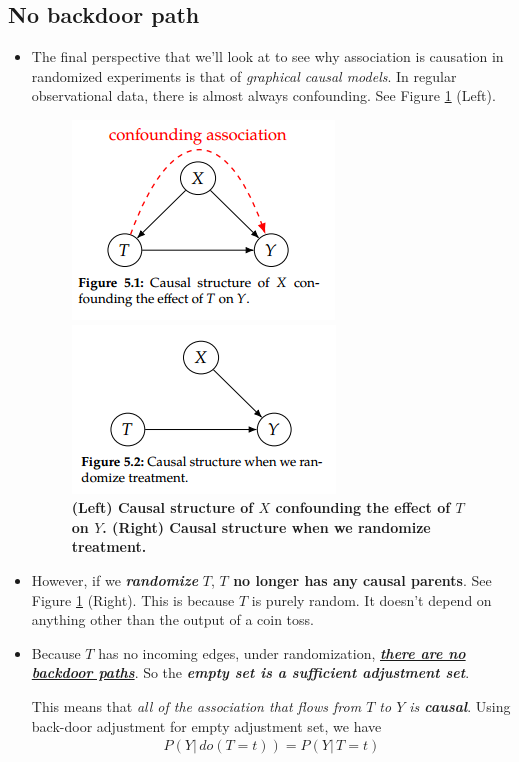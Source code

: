 \documentclass[11pt]{article}
\begin{document}
\subsection{No backdoor path}
\begin{itemize}
\item The final perspective that we’ll look at to see why association is causation in randomized experiments is that of \emph{graphical causal models}. In regular
observational data, there is almost always confounding. See Figure \ref{fig: random_graph} (Left).
\begin{figure}
\begin{minipage}[t]{0.5\linewidth}
  \centering
  \centerline{\includegraphics[scale = 0.7]{random_conf_graph.png}}
\end{minipage}
\begin{minipage}[t]{0.5\linewidth}
  \centering
  \centerline{\includegraphics[scale = 0.7]{random_no_back_door.png}}
\end{minipage}
\caption{\footnotesize{\textbf{(Left) Causal structure of $X$ confounding the effect of $T$ on $Y$. (Right) Causal structure when we randomize treatment. \citep{neal2020introduction}}}}
\label{fig: random_graph}
\end{figure}

\item However, if we \emph{\textbf{randomize}} $T$, \textbf{$T$ no longer has any causal parents}.  See Figure \ref{fig: random_graph} (Right). This is because $T$ is
purely random. It doesn’t depend on anything other than the output of a coin toss.

\item Because $T$ has no incoming edges, under randomization, \underline{\emph{\textbf{there are no backdoor paths}}}. So the \textbf{\emph{empty set is a sufficient adjustment set}}. 

This means that \emph{all of the association that flows from $T$ to $Y$ is \textbf{causal}}. Using back-door adjustment for empty adjustment set, we have 
\begin{align*}
P(Y |\, do(T=t)) = P(Y|\, T=t)
\end{align*}
\end{itemize}
\end{document}
